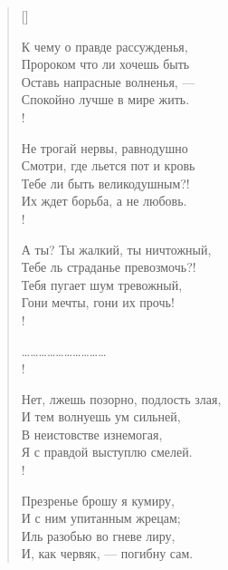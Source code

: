 \settowidth{\versewidth}{А ты? Ты жалкий, ты ничтожный,}
\begin{verse}[\versewidth]
\begin{altverse}
К чему о правде рассужденья,\\ 
Пророком что ли хочешь быть\ldotse\\
Оставь напрасные волненья, ---\\
Спокойно лучше в мире жить.\\!

Не трогай нервы, равнодушно\\
Смотри, где льется пот и кровь\ldotst\\
Тебе ли быть великодушным?!\\
Их ждет борьба, а не любовь.\\!

А ты? Ты жалкий, ты ничтожный,\\
Тебе ль страданье превозмочь?!\\
Тебя пугает шум тревожный,\\
Гони мечты, гони их прочь!\\!
\end{altverse}
\vin\ldots\ldots\ldots\ldots\ldots\ldots\ldots\ldots\ldots\ldots\\!
\begin{altverse}
Нет, лжешь позорно, подлость злая,\\
И тем волнуешь ум сильней,\\
В неистовстве изнемогая,\\
Я с правдой выступлю смелей.\\!

Презренье брошу я кумиру,\\
И с ним упитанным жрецам;\\
Иль разобью во гневе лиру,\\
И, как червяк, --- погибну сам.
\end{altverse}
\end{verse}

\newpage
\vspace*{0cm}



